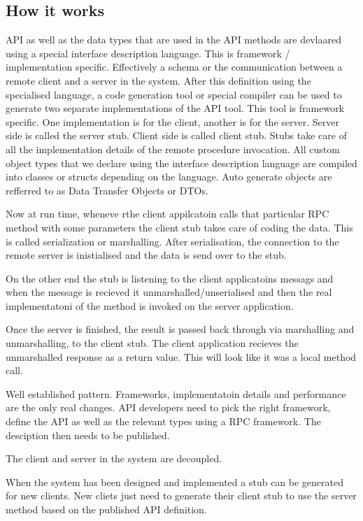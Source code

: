 \documentclass[a4paper, 11pt]{book}
\begin{document}
    \subsection{How it works}
    API as well as the data types that are used in the API methods are devlaared using a special interface description language.
    This is framework / implementation specific. Effectively a schema or the communication between a remote client and a server in the system.
    After this definition using the specialised language, a code generation tool or special compiler can be used to generate two separate implementations of the API tool.
    This tool is framework specific.
    One implementation is for the client, another is for the server.
    Server side is called the server stub.
    Client side is called client stub.
    Stubs take care of all the implementation details of the remote procedure invocation.
    All custom object types that we declare using the interface description language are compiled into classes or structs depending on the language.
    Auto generate objects are refferred to as Data Transfer Objects or DTOs.

    Now at run time, wheneve rthe client appilcatoin calls that particular RPC method with some parameters the client stub takes care of coding the data.
    This is called serialization or marshalling.
    After serialisation, the connection to the remote server is inistialised and the data is send over to the stub.

    On the other end the stub is listening to the client applicatoins messags and when the message is recieved it
    unmarshalled/unserialised and then the real implementatoni of the method is invoked on the server application.

    Once the server is finished, the result is passed back through via marshalling and unmarshalling, to the client stub.
    The client application recieves the unmarshalled response as a return value.
    This will look like it was a local method call.

    Well established pattern. Frameworks, implementatoin details and performance are the only real changes.
    API developers need to pick the right framework, define the API as well as the relevant types using a RPC framework.
    The desciption then needs to be published.

    The client and server in the system are decoupled.

    When the system has been designed and implemented a stub can be generated for new clients.
    New cliets just need to generate their client stub to use the server method based on the published API definition.
\end{document}
